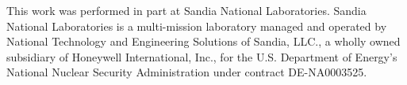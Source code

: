 This work was performed in part at Sandia National Laboratories. Sandia
National Laboratories is a multi-mission laboratory managed and operated by
National Technology and Engineering Solutions of Sandia, LLC., a wholly owned
subsidiary of Honeywell International, Inc., for the U.S. Department of
Energy’s National Nuclear Security Administration under contract DE-NA0003525.
